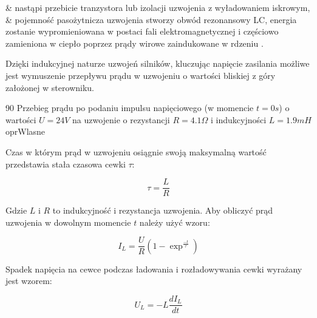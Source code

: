 \begin{easylist}
	& nastąpi przebicie tranzystora lub izolacji uzwojenia z wyładowaniem iskrowym,
	& pojemność pasożytnicza uzwojenia stworzy obwód rezonansowy LC, energia zostanie wypromieniowana w postaci fali elektromagnetycznej i częściowo zamieniona w ciepło poprzez prądy wirowe zaindukowane w rdzeniu \cite{przepiorkowski}.
	\\
\end{easylist}

Dzięki indukcyjnej naturze uzwojeń silników, kluczując napięcie zasilania możliwe jest wymuszenie przepływu prądu w uzwojeniu o wartości bliskiej z góry założonej w sterowniku.

	{90}
	{Przebieg prądu po podaniu impulsu napięciowego (w momencie $ t = 0 s $) o wartości $ U = 24 V $ na uzwojenie o rezystancji $ R = 4.1 \Omega $ i indukcyjności $ L = 1.9 mH $}
	{oprWlasne}
	
Czas w którym prąd w uzwojeniu osiągnie swoją maksymalną wartość przedstawia stała czasowa cewki $ \tau $:

\begin{equation} \label{eq:ster1}
	\tau = \frac{L}{R}
\end{equation}

Gdzie $ L $ i $ R $ to indukcyjność i rezystancja uzwojenia. Aby obliczyć prąd uzwojenia w dowolnym momencie $ t $ należy użyć wzoru:

\begin{equation} \label{eq:ster2}
	I_L = \frac{U}{R} (1 - \exp^\frac{-t}{\tau})
\end{equation}

Spadek napięcia na cewce podczas ładowania i rozładowywania cewki wyrażany jest wzorem:

\begin{equation} \label{eq:ster3}
	U_L = - L \frac{dI_L}{dt}
\end{equation}

\clearpage






